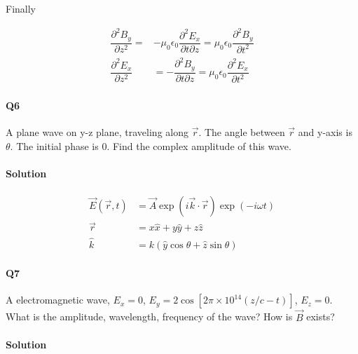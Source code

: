\documentclass{article}
\begin{document}
Finally

\begin{equation*}
  \begin{aligned}
    \dfrac{\partial^{2} B_{y}}{\partial z^{2}} =& - \mu_0 \epsilon_0 \dfrac{\partial^{2} E_{x}}{\partial t \partial z} = \mu_0 \epsilon_0 \dfrac{\partial^{2} B_{y}}{\partial t^{2}}\\
    \dfrac{\partial^2 E_x}{\partial z^2} &= - \dfrac{\partial^2 B_y}{\partial t \partial z} =   \mu_0 \epsilon_0 \dfrac{\partial^2 E_x}{\partial t^2} 
  \end{aligned}
\end{equation*}

\paragraph{Q6}

A plane wave on y-z plane, traveling along $\vec{r}$. The angle between $\vec{r}$ and y-axis is $\theta$. The initial phase is $0$. Find the complex amplitude of this wave.

\paragraph{Solution}

\begin{equation*}
  \begin{aligned}
    \vec{E} \left( \vec{r} , t \right) &= \vec{A} \exp \left( i \vec{k} \cdot \vec{r} \right) \exp \left( - i \omega t \right) \\
    \vec{r} &= x \hat{x} + y \hat{y} + z \hat{z} \\
    \hat{k} &= k \left( \hat{y} \cos \theta + \hat{z} \sin \theta \right)
  \end{aligned}
\end{equation*}

\paragraph{Q7}

A electromagnetic wave, $E_x = 0$, $E_y = 2 \cos \left[ 2 \pi \times 10^{14} \left( z/c -t \right) \right]$, $E_z = 0$. What is the amplitude, wavelength, frequency of the wave? How is $\vec{B}$ exists?

\paragraph{Solution}
\end{document}
